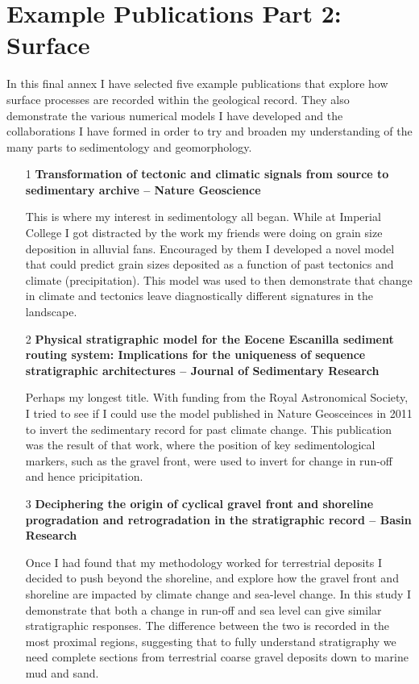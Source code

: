 \chapter{Example Publications Part 2: Surface}

In this final annex I have selected five example publications that explore how surface processes are recorded within the geological record. They also demonstrate the various numerical models I have developed and the collaborations I have formed in order to try and broaden my understanding of the many parts to sedimentology and geomorphology.

\begin{itemize}

\item [1] {\bf Transformation of tectonic and climatic signals from source to sedimentary archive -- Nature Geoscience}

This is where my interest in sedimentology all began. While at Imperial College I got distracted by the work my friends were doing on grain size deposition in alluvial fans. Encouraged by them I developed a novel model that could predict grain sizes deposited as a function of past tectonics and climate (precipitation). This model was used to then demonstrate that change in climate and tectonics leave diagnostically different signatures in the landscape.

\item[2] {\bf Physical stratigraphic model for the Eocene Escanilla sediment routing system: Implications for the uniqueness of sequence stratigraphic architectures -- Journal of Sedimentary Research}

Perhaps my longest title. With funding from the Royal Astronomical Society, I tried to see if I could use the model published in Nature Geosceinces in 2011 to invert the sedimentary record for past climate change. This publication was the result of that work, where the position of key sedimentological markers, such as the gravel front, were used to invert for change in run-off and hence pricipitation.

\item[3] {\bf Deciphering the origin of cyclical gravel front and shoreline progradation and retrogradation in the stratigraphic record -- Basin Research}

Once I had found that my methodology worked for terrestrial deposits I decided to push beyond the shoreline, and explore how the gravel front and shoreline are impacted by climate change and sea-level change. In this study I demonstrate that both a change in run-off and sea level can give similar stratigraphic responses. The difference between the two is recorded in the most proximal regions, suggesting that to fully understand stratigraphy we need complete sections from terrestrial coarse gravel deposits down to marine mud and sand.


\end{itemize}

